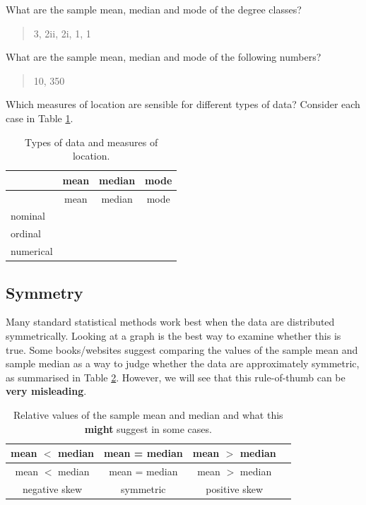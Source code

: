 \documentclass[
  british,
  11pt,
  openany, a4paper]{book}
\begin{document}
What are the sample mean, median and mode of the degree classes?

\begin{quote}
3, 2ii, 2i, 1, 1
\end{quote}

What are the sample mean, median and mode of the following numbers?

\begin{quote}
10, 350
\end{quote}

Which measures of location are sensible for different types of data? Consider each case in Table \ref{tab:whichmeasures}.

\begin{longtable}[]{@{}lccc@{}}
\caption{\label{tab:whichmeasures} Types of data and measures of location.}\tabularnewline
\toprule\noalign{}
& mean & median & mode \\
\midrule\noalign{}
\endfirsthead
\toprule\noalign{}
& mean & median & mode \\
\midrule\noalign{}
\endhead
\bottomrule\noalign{}
\endlastfoot
nominal & & & \\
ordinal & & & \\
numerical & & & \\
\end{longtable}

\subsection{Symmetry}\label{symmetry}

Many standard statistical methods work best when the data are distributed symmetrically. Looking at a graph is the best way to examine whether this is true. Some books/websites suggest comparing the values of the sample mean and sample median as a way to judge whether the data are approximately symmetric, as summarised in Table \ref{tab:thumb}. However, we will see that this rule-of-thumb can be \textbf{very misleading}.

\begin{longtable}[]{@{}cccc@{}}
\caption{\label{tab:thumb} Relative values of the sample mean and median and what this \textbf{might} suggest in some cases.}\tabularnewline
\toprule\noalign{}
mean \(<\) median & mean = median & mean \(>\) median & \\
\midrule\noalign{}
\endfirsthead
\toprule\noalign{}
mean \(<\) median & mean = median & mean \(>\) median & \\
\midrule\noalign{}
\endhead
\bottomrule\noalign{}
\endlastfoot
negative skew & symmetric & positive skew & \\
\end{longtable}
\end{document}
